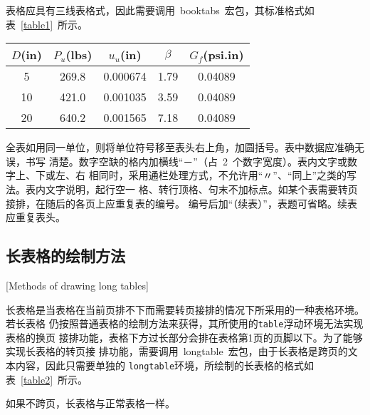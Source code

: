 表格应具有三线表格式，因此需要调用~booktabs~宏包，其标准格式如表~\ref{table1}~所示。
\begin{table}[htbp]
\vspace{0.5em}\centering\wuhao
\begin{tabular}{ccccc}
\toprule[1.5pt]
$D$(in) & $P_u$(lbs) & $u_u$(in) & $\beta$ & $G_f$(psi.in)\\
\midrule[1pt]
 5 & 269.8 & 0.000674 & 1.79 & 0.04089\\
10 & 421.0 & 0.001035 & 3.59 & 0.04089\\
20 & 640.2 & 0.001565 & 7.18 & 0.04089\\
\bottomrule[1.5pt]
\end{tabular}
\end{table}
全表如用同一单位，则将单位符号移至表头右上角，加圆括号。表中数据应准确无误，书写
清楚。数字空缺的格内加横线“－”（占~2~个数字宽度）。表内文字或数字上、下或左、右
相同时，采用通栏处理方式，不允许用“〃”、“同上”之类的写法。表内文字说明，起行空一
格、转行顶格、句末不加标点。如某个表需要转页接排，在随后的各页上应重复表的编号。
编号后加“（续表）”，表题可省略。续表应重复表头。

\subsection{长表格的绘制方法}[Methods of drawing long tables]

长表格是当表格在当前页排不下而需要转页接排的情况下所采用的一种表格环境。若长表格
仍按照普通表格的绘制方法来获得，其所使用的\verb|table|浮动环境无法实现表格的换页
接排功能，表格下方过长部分会排在表格第1页的页脚以下。为了能够实现长表格的转页接
排功能，需要调用~longtable~宏包，由于长表格是跨页的文本内容，因此只需要单独的
\verb|longtable|环境，所绘制的长表格的格式如表~\ref{table2}~所示。

如果不跨页，长表格与正常表格一样。

